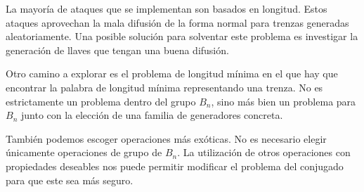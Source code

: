 \documentclass[12pt]{book}
\theoremstyle{definition}
\begin{document}
La mayoría de ataques que se implementan son basados en longitud. Estos ataques aprovechan la mala difusión de la forma normal para trenzas generadas aleatoriamente. Una posible solución para solventar este problema es investigar la generación de llaves que tengan una buena difusión.

Otro camino a explorar es el problema de longitud mínima en el que hay que encontrar la palabra de longitud mínima representando una trenza. No es estrictamente un problema dentro del grupo $B_n$, sino más bien un problema para $B_n$ junto con la elección de una familia de generadores concreta.

También podemos escoger operaciones más exóticas. No es necesario elegir únicamente operaciones de grupo de $B_n$. La utilización de otros operaciones con propiedades deseables nos puede permitir modificar el problema del conjugado para que este sea más seguro.
\end{document}
